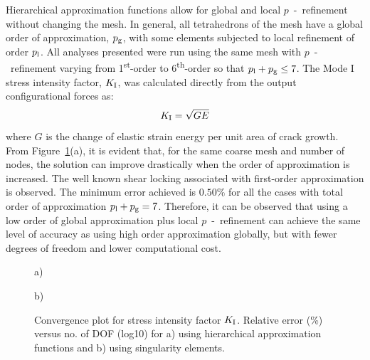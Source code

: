 \documentclass[onecolumn]{svjour3}
\begin{document}
Hierarchical approximation functions allow for global and local $p$~-~refinement without changing the mesh.
In general, all tetrahedrons of the mesh have a global order of approximation, $p_{\rm g}$, with some elements subjected to local refinement of order $p_{\rm{l}}$.
All analyses presented were run using the same mesh with $p$~-~refinement varying from 1\textsuperscript{st}-order to 6\textsuperscript{th}-order so that $p_{\rm l} + p_{\rm g} \leq 7$.
The Mode I stress intensity factor, $K_{\rm I}$, was calculated directly from the output configurational forces as: 
\begin{equation}\label{eq:SIF_g_c}
K_{\rm I} = \sqrt{GE}
\end{equation}
where $G$ is the change of elastic strain energy per unit area of crack growth.
From Figure~\ref{fig:plate_conv}(a), it is evident that, for the same coarse mesh and number of nodes, the solution can improve drastically when the order of approximation is increased. 
The well known shear locking associated with first-order approximation is observed. 
The minimum error achieved is $0.50\%$ for all the cases with total order of approximation  $p_{\rm l} + p_{\rm g} = 7$. 
Therefore, it can be observed that using a low order of global approximation plus local $p$~-~refinement 
can achieve the same level of accuracy as using high order approximation globally, but with fewer degrees of freedom and lower computational cost.
\begin{figure}[h]
	\centering

	
	\begin{minipage}{.45\textwidth}
		\begin{centering} a) \end{centering}
	\end{minipage}%
	\begin{minipage}{.45\textwidth}
\begin{centering} b) \end{centering}
	\end{minipage}
	\caption{Convergence plot for stress intensity factor $K_{\rm I}$. Relative error (\%) versus no. of DOF (log10) for a) using hierarchical approximation functions and b) using singularity elements.}
			\label{fig:plate_conv}
\end{figure}
\end{document}
